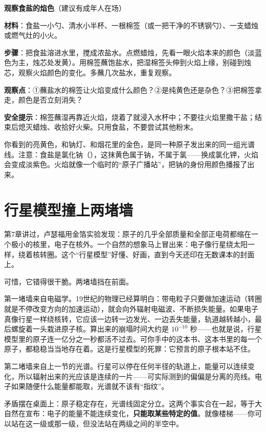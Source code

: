 \begin{shiyan}
\textbf{观察食盐的焰色}（建议有成年人在场）

\textbf{材料}：食盐一小勺、清水小半杯、一根棉签（或一把干净的不锈钢勺）、一支蜡烛或燃气灶的小火。

\textbf{步骤}：把食盐溶进水里，搅成浓盐水。点燃蜡烛，先看一眼火焰本来的颜色（淡蓝色为主，烛芯处发黄）。用棉签蘸饱盐水，把湿棉签头伸到火焰上缘，别碰到烛芯，观察火焰颜色的变化。多蘸几次盐水，重复观察。

\textbf{观察点}：①蘸盐水的棉签让火焰变成什么颜色？②是纯黄色还是杂色？③把棉签拿走，颜色是否立刻消失？

\textbf{安全提示}：棉签蘸湿再靠近火焰，烧着了就浸入水杯中；不要往火焰里撒干盐；结束后熄灭蜡烛、收拾好火柴。只用食盐，不要尝试其他粉末。

你看到的亮黄色，和钠灯、和烟花里的金色，是同一种原子发出来的同一组光谱线。注意：食盐是氯化钠（），这抹黄色属于钠，不属于氯——换成氯化钾，火焰会变成淡紫色。火焰就像一个临时的“原子广播站”，把钠的身份用颜色播报了出来。
\end{shiyan}

\section{行星模型撞上两堵墙}

第7章讲过，卢瑟福用金箔实验发现：原子的几乎全部质量和全部正电荷都缩在一个极小的核里，电子在核外。一个自然的想象马上冒出来：电子像行星绕太阳一样，绕着核转圈。这个“行星模型”好懂、好画，直到今天还印在无数课本的封面上。

可惜，它错得很干脆。两堵墙挡在前面。

第一堵墙来自电磁学。19世纪的物理已经算明白：带电粒子只要做加速运动（转圈就是不停改变方向的加速运动），就会向外辐射电磁波、不断损失能量。如果电子真像行星一样绕核转，它应该一边转一边发光、一边丢失能量，轨道越转越小，最后螺旋着一头栽进原子核。算出来的崩塌时间大约是 $10^{-10}$ 秒——也就是说，行星模型里的原子连一亿分之一秒都活不过去。可你手中的这本书、这本书里的每一个原子，都稳稳当当地存在着。这是行星模型的死罪：它预言的原子根本站不住。

第二堵墙来自上一节的光谱。行星可以停在任何半径的轨道上，能量可以连续变化，所以辐射出来的光应该是连续的一片——可实际测到的偏偏是分离的亮线。电子如果随便什么能量都能取，光谱就不该有“指纹”。

矛盾摆在桌面上：原子稳定存在，光谱线固定分立。这两个事实合在一起，等于大自然在宣布：电子的能量不能连续变化，\textbf{只能取某些特定的值}。就像楼梯——你可以站在这一级或那一级，但没法站在两级之间的半空中。


